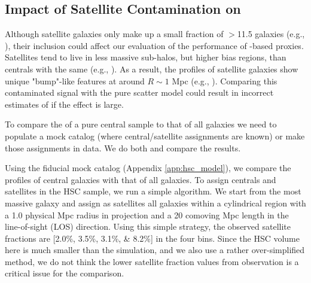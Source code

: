 \documentclass[fleqn,usenatbib,useAMS,english]{mnras}
\begin{document}
\subsection{Impact of Satellite Contamination on \dsigma{}}
    \label{sec:satellite}

    Although satellite galaxies only make up a small fraction of $>$11.5 galaxies
    (e.g., \citealt{More2015, vanUitert2016, Huang2020}), their inclusion could affect our evaluation
    of the performance of \mstar{}-based \mvir{} proxies.
    Satellites tend to live in less massive sub-halos, but higher bias regions, than centrals
    with the same \mstar{}
    (e.g., \citealt{vanUitert2016, Niemiec2017, Niemiec2019, Dvornik2020, Engler2021}).
    As a result, the \dsigma{} profiles of satellite galaxies show unique "bump"-like features at around
    $R \sim 1$ Mpc (e.g., \citealt{LiShan2014, LiShan2016, Sifon2015, Sifon2018}).
    Comparing this contaminated signal with the pure scatter model could result in incorrect
    estimates of \sigmh{} if the effect is large.

    To compare the \dsigma{} of a pure central sample to that of all galaxies we need to
    populate a mock catalog (where central/satellite assignments are known) or make those
    assignments in data. We do both and compare the results.
    
    Using the fiducial mock catalog (Appendix \ref{app:hsc_model}), we compare the
    \dsigma{} profiles of central galaxies with that of all galaxies.
    To assign centrals and satellites in the HSC sample, we run a simple algorithm.
    We start from the most massive \mmax{} galaxy and assign as satellites all galaxies
    within a cylindrical region with a 1.0 physical Mpc radius in projection and a 20 
    comoving Mpc length in the line-of-sight (LOS) direction.
    Using this simple strategy, the observed satellite fractions are [2.0\%, 3.5\%, 3.1\%, \& 8.2\%] 
    in the four bins.
    Since the HSC volume here is much smaller than the  simulation, and we also use 
    a rather over-simplified method, we do not think the lower satellite fraction values
    from observation is a critical issue for the comparison.
\end{document}

